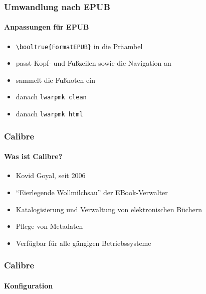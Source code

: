 \documentclass[12pt,ngerman]{beamer}
\begin{document}
\begin{frame}[fragile]
\frametitle{Umwandlung nach EPUB}
\framesubtitle{Anpassungen für EPUB}

\begin{itemize}
\item \verb|\booltrue{FormatEPUB}| in die Präambel
\item passt Kopf- und Fußzeilen sowie die Navigation an
\item sammelt die Fußnoten ein
\item danach \texttt{lwarpmk clean}
\item danach \texttt{lwarpmk html}
\end{itemize}
\end{frame}


\begin{frame}
\frametitle{Calibre}
\framesubtitle{Was ist Calibre?}

\begin{itemize}
\item Kovid Goyal, seit 2006
\item \enquote{Eierlegende Wollmilchsau} der EBook-Verwalter
\item Katalogisierung und Verwaltung von elektronischen Büchern
\item Pflege von Metadaten
\item Verfügbar für alle gängigen Betriebssysteme
\end{itemize}
\end{frame}

\begin{frame}
\frametitle{Calibre}
\framesubtitle{Konfiguration}

\begin{center}
\end{center}

\end{frame}
\end{document}
